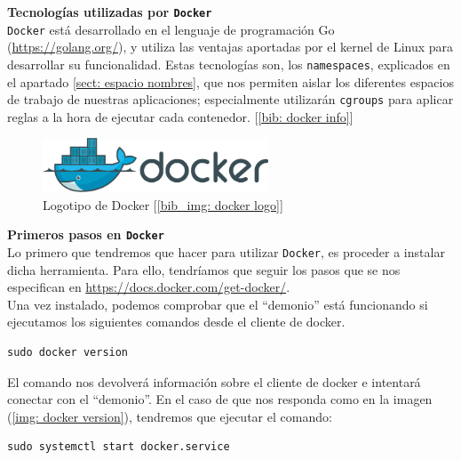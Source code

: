 \documentclass[12pt]{article}
\begin{document}
	\pagebreak
	
	\noindent \textbf{\large Tecnologías utilizadas por \texttt{Docker}}\\
	
	\noindent \texttt{Docker} está desarrollado en el lenguaje de programación Go (\url{https://golang.org/}), y utiliza las ventajas aportadas por el kernel de Linux para desarrollar su funcionalidad. Estas tecnologías son, los \texttt{namespaces}, explicados en el apartado \ref{sect: espacio nombres}, que nos permiten aislar los diferentes espacios de trabajo de nuestras aplicaciones; especialmente utilizarán \texttt{cgroups} para aplicar reglas a la hora de ejecutar cada contenedor. [\ref{bib: docker info}]
	
	\vspace{10px}
	
	\begin{figure}[h]
		\begin{center}
			\includegraphics[width=0.6\textwidth]{img/docker_logo.png}
			\caption{Logotipo de Docker [\ref{bib_img: docker logo}]}
		\end{center}
	\end{figure}
	
	\vspace{10px}
	\noindent \textbf{\large Primeros pasos en \texttt{Docker}}\\
	
	\noindent Lo primero que tendremos que hacer para utilizar \texttt{Docker}, es proceder a instalar dicha herramienta. Para ello, tendríamos que seguir los pasos que se nos especifican en \url{https://docs.docker.com/get-docker/}. \\
	
	\noindent Una vez instalado, podemos comprobar que el ``demonio'' está funcionando si ejecutamos los siguientes comandos desde el cliente de docker.
	\begin{verbatim}
sudo docker version
	\end{verbatim}

	\noindent El comando nos devolverá información sobre el cliente de docker e intentará conectar con el ``demonio''. En el caso de que nos responda como en la imagen (\ref{img: docker version}), tendremos que ejecutar el comando:
	\begin{verbatim}
sudo systemctl start docker.service
	\end{verbatim}
	
\end{document}
